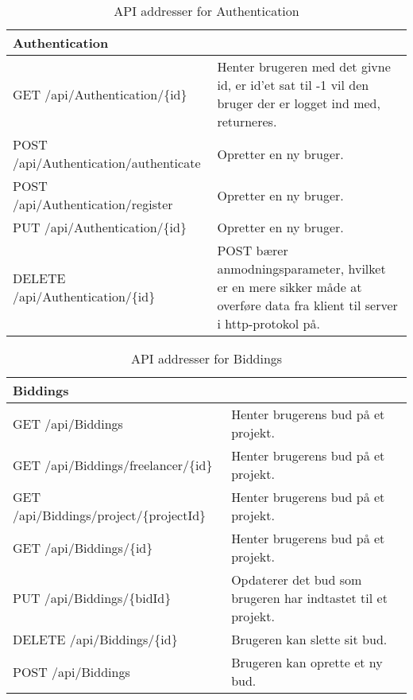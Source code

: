 \begin{table}[H]
	\centering
	\caption{API addresser for Authentication}
	\label{tab:web_user}
	\begin{tabular}{p{5cm}|p{11cm}}
		\hline
		\multicolumn{2}{l}{\textbf{Authentication}}\\
		\hline
		GET \newline
		/api/Authentication/\{id\} &
		Henter brugeren med det givne id, er id'et sat til -1 vil den bruger der er logget ind med, returneres. \\
		\hline
		POST \newline
		/api/Authentication/authenticate &
		Opretter en ny bruger. \\
        \hline
        POST \newline
		/api/Authentication/register &
		Opretter en ny bruger. \\
        \hline
        PUT \newline
		/api/Authentication/\{id\} &
		Opretter en ny bruger. \\
		\hline
		DELETE \newline
		/api/Authentication/\{id\} &
		POST bærer anmodningsparameter, hvilket er en mere sikker måde at overføre data fra klient til server i http-protokol på. \\
		\hline
	\end{tabular}
\end{table}


\begin{table}[H]
	
	\centering
	\caption{API addresser for Biddings}
	\label{tab:web_user}
	\begin{tabular}{p{5cm}|p{11cm}}
		\hline
		\multicolumn{2}{l}{\textbf{Biddings}}\\
		\hline
		GET \newline
		/api/Biddings &
		Henter brugerens bud på et projekt. \\
        \hline
        GET \newline
		/api/Biddings/freelancer/\{id\} &
		Henter brugerens bud på et projekt. \\
        \hline
        GET \newline
		/api/Biddings/project/\{projectId\} &
		Henter brugerens bud på et projekt. \\
        \hline
        GET \newline
		/api/Biddings/\{id\} &
		Henter brugerens bud på et projekt. \\
		\hline
		PUT \newline
		/api/Biddings/\{bidId\} &
		Opdaterer det bud som brugeren har indtastet til et projekt. \\
		\hline
		DELETE \newline
		/api/Biddings/\{id\} &
		Brugeren kan slette sit bud. \\
		\hline
		POST \newline
		/api/Biddings &
		Brugeren kan oprette et ny bud. \\
		\hline
	
	\end{tabular}
\end{table}


